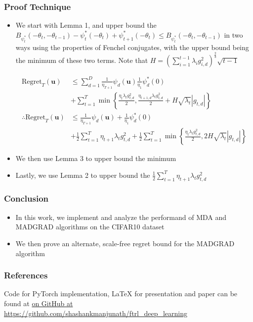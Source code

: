 \documentclass{beamer}
\newcommand{\Regret}{\text{Regret}}
\newcommand{\bu}{\mathbf{u}}
\begin{document}
\begin{frame}[shrink=20]
  \frametitle{Proof Technique}
  \begin{itemize}
    \item We start with Lemma 1, and upper bound the $B_{\psi_{t}^*}(-\theta_t, -\theta_{t-1}) - \psi_{t}^* (-\theta_t)
      + \psi_{t+1}^*(-\theta_t) \leq B_{\psi_{t}^*}(-\theta_t, -\theta_{t-1})$ in two ways using the properties of
      Fenchel conjugates, with the upper bound being the minimum of these two terms. Note that $H =
      \left(\sum\limits_{i=1}^{t-1} \lambda_i g_{i,d}^2\right)^\frac{2}{3} \sqrt{t-1}$

      \begin{align*}
        \Regret_T(\bu) &\leq \sum\limits_{d=1}^D \frac{1}{\eta_{T+1}}\psi_{d}(\bu) \frac{1}{\eta_1}\psi_{d}^*(0) \\
                       & + \sum\limits_{t=1}^T \min \left\{\frac{\eta_t \lambda_t g_{t,d}^2}{2}, \frac{\eta_{t+1,d}
                       \lambda_t g_{t,d}^2}{2} + H \sqrt{\lambda_t}|g_{t,d}|\right\} \\
        \therefore \Regret_T(\bu) &\leq \frac{1}{\eta_{T+1}}\psi_{d}(\bu) + \frac{1}{\eta_1}\psi_{d}^*(0) \\
                                  & +\frac{1}{2}\sum\limits_{t=1}^T \eta_{t+1} \lambda_t g_{t,d}^2 +
                                  \frac{1}{2}\sum\limits_{t=1}^T \min \left\{\frac{\eta_t \lambda_t g_{t,d}^2}{2},  2H
                                  \sqrt{\lambda_t}|g_{t,d}|\right\}
      \end{align*}

    \item We then use Lemma 3 to upper bound the minimum
    \item Lastly, we use Lemma 2 to upper bound the $\frac{1}{2}\sum\limits_{t=1}^T \eta_{t+1} \lambda_t g_{t,d}^2$
  \end{itemize}
\end{frame}

\begin{frame}
  \frametitle{Conclusion}
  \begin{itemize}
    \item In this work, we implement and analyze the performand of MDA and MADGRAD algorithms on the CIFAR10 dataset
    \item We then prove an alternate, scale-free regret bound for the MADGRAD algorithm
  \end{itemize}
\end{frame}

\begin{frame}[shrink=20]
  \frametitle{References}
  
  

  Code for PyTorch implementation, LaTeX for presentation and paper can be found at
  \href{https://github.com/shashankmanjunath/ftrl_deep_learning}{on GitHub at
  https://github.com/shashankmanjunath/ftrl\_deep\_learning}
\end{frame}
\end{document}
